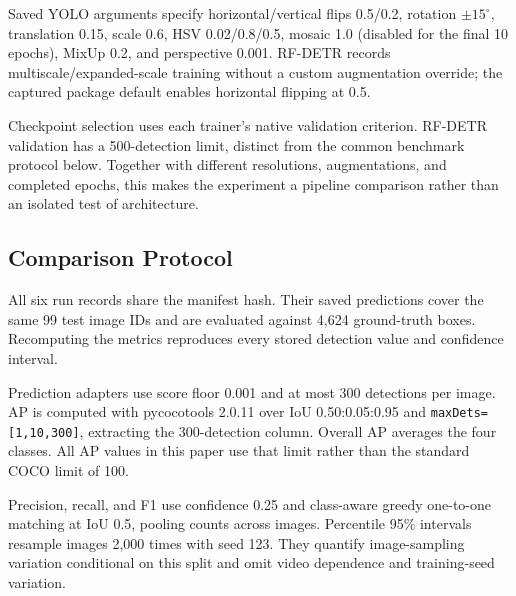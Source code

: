 \documentclass[10pt,conference,letterpaper]{IEEEtran}
\begin{document}
Saved YOLO arguments specify horizontal/vertical flips 0.5/0.2, rotation $\pm15^{\circ}$, translation 0.15, scale 0.6, HSV 0.02/0.8/0.5, mosaic 1.0 (disabled for the final 10 epochs), MixUp 0.2, and perspective 0.001. RF-DETR records multiscale/expanded-scale training without a custom augmentation override; the captured package default enables horizontal flipping at 0.5.

Checkpoint selection uses each trainer's native validation criterion. RF-DETR validation has a 500-detection limit, distinct from the common benchmark protocol below. Together with different resolutions, augmentations, and completed epochs, this makes the experiment a pipeline comparison rather than an isolated test of architecture.

\subsection{Comparison Protocol}
All six run records share the manifest hash. Their saved predictions cover the same 99 test image IDs and are evaluated against 4,624 ground-truth boxes. Recomputing the metrics reproduces every stored detection value and confidence interval.

Prediction adapters use score floor 0.001 and at most 300 detections per image. AP is computed with pycocotools 2.0.11 over IoU 0.50:0.05:0.95 and \texttt{maxDets=[1,10,300]}, extracting the 300-detection column. Overall AP averages the four classes. All AP values in this paper use that limit rather than the standard COCO limit of 100.

Precision, recall, and F1 use confidence 0.25 and class-aware greedy one-to-one matching at IoU 0.5, pooling counts across images. Percentile 95\% intervals resample images 2,000 times with seed 123. They quantify image-sampling variation conditional on this split and omit video dependence and training-seed variation.
\end{document}
